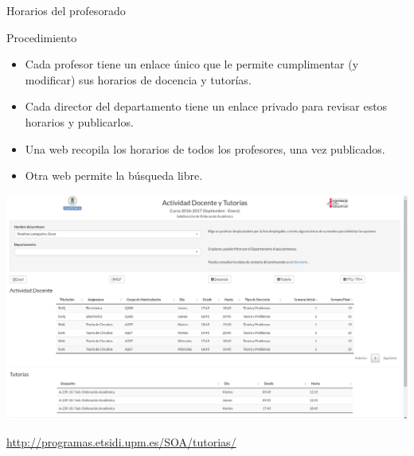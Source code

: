 \documentclass[spanish, xcolor={usenames,svgnames,dvipsnames}]{beamer}
\begin{document}
\begin{frame}[label={sec:orgac614cc}]{Horarios del profesorado}
\begin{block}{Procedimiento}
\begin{itemize}
\item Cada profesor tiene un enlace único que le permite cumplimentar (y modificar) sus horarios de docencia y tutorías.
\item Cada director del departamento tiene un enlace privado para revisar estos horarios y publicarlos.
\item Una web recopila los horarios de todos los profesores, una vez publicados.
\item Otra web permite la búsqueda libre.
\end{itemize}
\end{block}
\end{frame}
\begin{frame}[label={sec:orga014f12}]{}
\begin{center}
\includegraphics[width=.9\linewidth]{images/tutorias.png}
\end{center}

\url{http://programas.etsidi.upm.es/SOA/tutorias/}
\end{frame}
\end{document}
